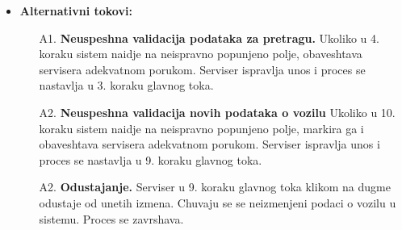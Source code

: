 \begin{itemize}
{}
\item{\textbf{Alternativni tokovi:} 
\begin{enumerate}
    \item [A1.] \textbf{Neuspeshna validacija podataka za pretragu.} Ukoliko u 4. koraku sistem naidje na neispravno popunjeno polje, obaveshtava servisera adekvatnom porukom. Serviser ispravlja unos i proces se nastavlja u 3. koraku glavnog toka.
    \item [A2.] \textbf{Neuspeshna validacija novih podataka o vozilu} Ukoliko u 10. koraku sistem naidje na neispravno popunjeno polje, markira ga i obaveshtava servisera adekvatnom porukom. Serviser ispravlja unos i proces se nastavlja u 9. koraku glavnog toka.
    \item[A2.] \textbf{Odustajanje.} Serviser u 9. koraku glavnog toka klikom na dugme odustaje od unetih izmena. Chuvaju se se neizmenjeni podaci o vozilu u sistemu. Proces se zavrshava.
\end{enumerate}
}
\end{itemize}


